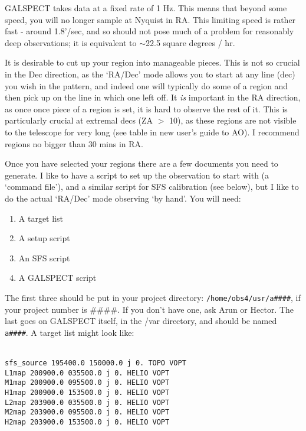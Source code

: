GALSPECT takes data at a fixed rate of 1 Hz. This means that beyond some speed, you will no longer sample at Nyquist in RA. This limiting speed is rather fast - around 1.8'/sec, and so should not pose much of a problem for reasonably deep observations; it is equivalent to $\sim$22.5 square degrees / hr. 

It is desirable to cut up your region into manageable pieces. This is not so crucial in the Dec direction, as the `RA/Dec' mode allows you to start at any line (dec) you wish in the pattern, and indeed one will typically do some of a region and then pick up on the line in which one left off. It \emph{is} important in the RA direction, as once once piece of a region is set, it is hard to observe the rest of it. This is particularly crucial at extremal decs (ZA $>$ 10), as these regions are not visible to the telescope for very long (see table in new user's guide to AO). I recommend regions no bigger than 30 mins in RA.

Once you have selected your regions there are a few documents you need to generate. I like to have a script to set up the observation to start with (a `command file'),  and a similar script for SFS calibration (see below), but I like to do the actual `RA/Dec' mode observing `by hand'. You will need:
\begin{enumerate}
\item A target list
\item A setup script
\item An SFS script
\item A GALSPECT script
\end{enumerate}
The first three should be put in your project directory: \texttt{/home/obs4/usr/a\#\#\#\#}, if your project number is $\#\#\#\#$. If you don't have one, ask Arun or Hector. The last goes on GALSPECT itself, in the /var directory, and should be named \texttt{a\#\#\#\#}. A target list might look like:

\texttt{\\
sfs\_source 195400.0 150000.0 j 0. TOPO VOPT\\
L1map 200900.0 035500.0 j 0. HELIO VOPT\\
M1map 200900.0 095500.0 j 0. HELIO VOPT\\
H1map 200900.0 153500.0 j 0. HELIO VOPT\\
L2map 203900.0 035500.0 j 0. HELIO VOPT\\
M2map 203900.0 095500.0 j 0. HELIO VOPT\\
H2map 203900.0 153500.0 j 0. HELIO VOPT\\
}

